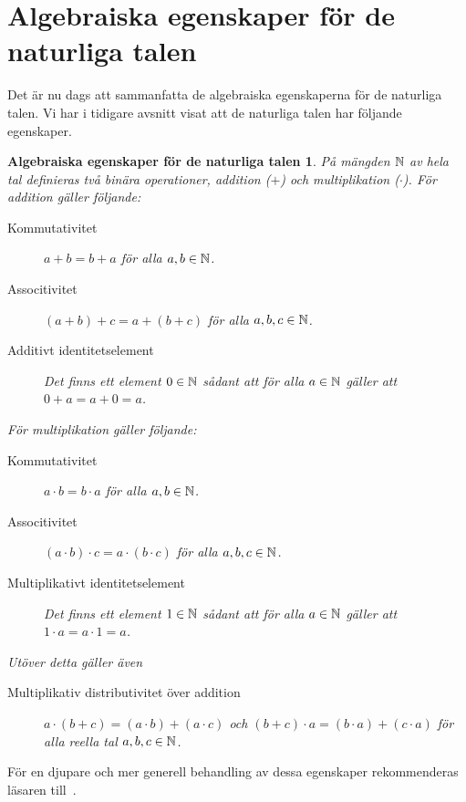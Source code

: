 \section{Algebraiska egenskaper för de naturliga talen}
\label{sec:HeltalensAlgebraiskaEgenskaper}
Det är nu dags att sammanfatta de algebraiska egenskaperna för de
naturliga talen.
Vi har i tidigare avsnitt visat att de naturliga talen har följande egenskaper.

\theoremstyle{plain}
\newtheorem*{AlgebraicPropertiesNatural}{Algebraiska egenskaper för de
  naturliga talen}
\begin{AlgebraicPropertiesNatural}\label{def:HeltalenEgenskaper}
  På mängden \(\mathbb{N}\) av hela tal definieras två binära operationer,
  addition (\(+\)) och multiplikation (\(\cdot\)).
  För addition gäller följande:
  \begin{description}
    \item[Kommutativitet] \(a+b=b+a\) för alla \(a,b\in\mathbb{N}\).
    \item[Associtivitet] \((a+b)+c=a+(b+c)\) för alla \(a,b,c\in\mathbb{N}\).
    \item[Additivt identitetselement] Det finns ett element \(0\in\mathbb{N}\)
      sådant att för alla \(a\in\mathbb{N}\) gäller att \(0+a = a+0 = a\).
  \end{description}
  För multiplikation gäller följande:
  \begin{description}
    \item[Kommutativitet] \(a \cdot b=b \cdot a\) för alla \(a,b\in\mathbb{N}\).
    \item[Associtivitet] \((a \cdot b) \cdot c=a \cdot (b \cdot c)\) för
      alla \(a,b,c\in\mathbb{N}\).
    \item[Multiplikativt identitetselement] Det finns ett element
      \(1\in\mathbb{N}\) sådant att för alla \(a\in\mathbb{N}\) gäller att
      \(1 \cdot a = a \cdot 1 = a\).
  \end{description}
  Utöver detta gäller även
  \begin{description}
    \item[Multiplikativ distributivitet över addition]
      \(a \cdot (b+c) = (a \cdot b) + (a \cdot c)\) och
      \((b+c) \cdot a = (b \cdot a) + (c \cdot a)\) för alla reella tal
      \(a,b,c\in\mathbb{N}\).
  \end{description}
\end{AlgebraicPropertiesNatural}

För en djupare och mer generell behandling av dessa egenskaper rekommenderas 
läsaren till~\cite{Bartle2000itr,Grillet2007aa}.


